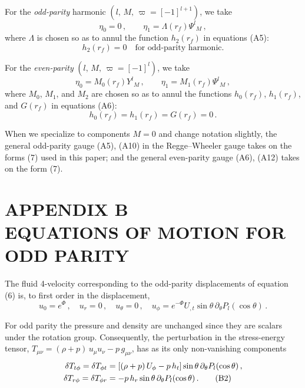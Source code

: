 \documentclass[12pt]{article}
\begin{document}
For the \emph{odd-parity} harmonic $(l,\, M,\, \varpi = [-1]^{l+1})$, we take
%
\begin{equation}
\eta_0 = 0 \,,
\qquad
\eta_1 = \Lambda(r_f)\Psi^l{}_{M} \,,
\tag{A9}
\end{equation}
%
where $\Lambda$ is chosen so as to annul the function $h_2(r_f)$ in equations (A5):
%
\begin{equation}
h_2(r_f) = 0 \quad \text{for odd-parity harmonic.}
\tag{A10}
\end{equation}

For the \emph{even-parity} $(l,\, M,\, \varpi = [-1]^l)$, we take
%
\begin{equation}
\eta_0 = M_0(r_f)Y^l{}_{M} \,,
\qquad
\eta_1 = M_1(r_f)\Psi^l{}_{M} \,,
\tag{A11}
\end{equation}
%
where $M_0$, $M_1$, and $M_2$ are chosen so as to annul the functions $h_0(r_f)$, $h_1(r_f)$, and $G(r_f)$ in equations (A6):
%
\begin{equation}
h_0(r_f) = h_1(r_f) = G(r_f) = 0 \,.
\tag{A12}
\end{equation}

When we specialize to components $M = 0$ and change notation slightly, the general odd-parity
gauge (A5), (A10) in the Regge--Wheeler gauge takes on the forms (7) used in this
paper; and the general even-parity gauge (A6), (A12) takes on the form (7).

\section*{APPENDIX B \\ EQUATIONS OF MOTION FOR ODD PARITY}

The fluid 4-velocity corresponding to the odd-parity displacements of equation (6) is, to
first order in the displacement,
%
\begin{equation}
u_0 = e^{\Phi} \,,
\quad
u_r = 0 \,,
\quad
u_\theta = 0 \,,
\quad
u_\phi = e^{-\Phi} U_{,t} \sin\theta\, \partial_\theta P_l(\cos\theta) \,.
\tag{B1}
\end{equation}

For odd parity the pressure and density are unchanged since they are scalars under the rotation
group. Consequently, the perturbation in the stress-energy tensor,
$T_{\mu\nu} = (\rho + p)\,u_\mu u_\nu - p\,g_{\mu\nu}$,
has as its only non-vanishing components
%
\begin{align}
\delta T_{t\phi} = \delta T_{\phi t} &= [(\rho+p)\,U_\phi - p\,h_t]
    \sin\theta\,\partial_\theta P_l(\cos\theta) \,, \notag \\
\delta T_{r\phi} = \delta T_{\phi r} &= -p\,h_r
    \sin\theta\,\partial_\theta P_l(\cos\theta) \,.
\tag{B2}
\end{align}
\end{document}
